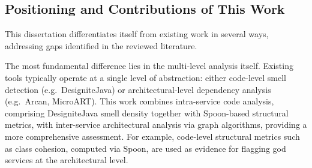 
\subsection{Positioning and Contributions of This Work}
\label{subsec:positioning}

\par This dissertation differentiates itself from existing work in several ways, addressing gaps identified in the reviewed literature.

The most fundamental difference lies in the multi-level analysis itself. Existing tools typically operate at a single level of abstraction: either code-level smell detection (e.g.\ DesigniteJava) or architectural-level dependency analysis (e.g.\ Arcan, MicroART). This work combines intra-service code analysis, comprising DesigniteJava smell density together with Spoon-based structural metrics, with inter-service architectural analysis via graph algorithms, providing a more comprehensive assessment. For example, code-level structural metrics such as class cohesion, computed via Spoon, are used as evidence for flagging god services at the architectural level.

